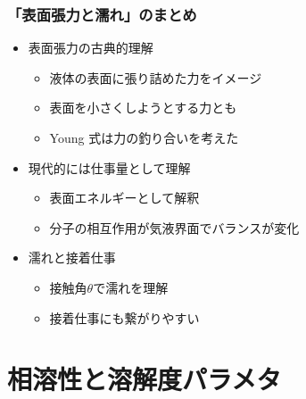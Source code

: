 \documentclass[unicode,12pt]{beamer}%
\begin{document}
\begin{frame}
	\frametitle{「表面張力と濡れ」のまとめ}
        \begin{boxnote}
            \vspace{-3mm}
            \begin{itemize}
                \item 表面張力の古典的理解
                    \begin{itemize}
                        \item 液体の表面に張り詰めた力をイメージ
						\item 表面を小さくしようとする力とも
						\item Young 式は力の釣り合いを考えた
                    \end{itemize} 
				\item 現代的には仕事量として理解
                    \begin{itemize}
                        \item 表面エネルギーとして解釈
                        \item 分子の相互作用が気液界面でバランスが変化
                    \end{itemize}
                \item 濡れと接着仕事
                    \begin{itemize}
                        \item 接触角$\theta$で濡れを理解
                        \item 接着仕事にも繋がりやすい
                    \end{itemize} 
            \end{itemize}
        \end{boxnote}
\end{frame}

\section{相溶性と溶解度パラメタ}
\end{document}
